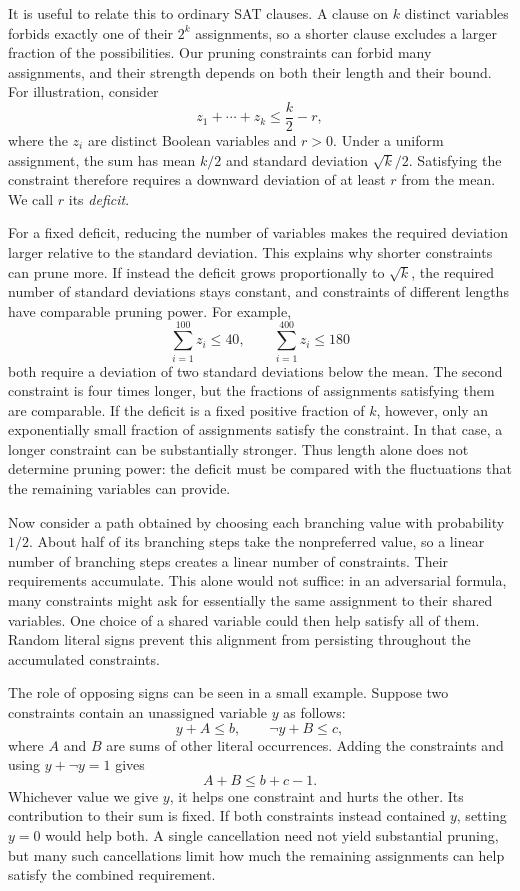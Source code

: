 \documentclass[11pt,a4paper]{article}
\theoremstyle{definition}
\theoremstyle{remark}
\begin{document}
It is useful to relate this to ordinary SAT clauses. A clause on $k$
distinct variables forbids exactly one of their $2^k$ assignments, so a
shorter clause excludes a larger fraction of the possibilities. Our
pruning constraints can forbid many assignments, and their strength
depends on both their length and their bound. For illustration, consider
\[
 z_1+\cdots+z_k\le \frac{k}{2}-r,
\]
where the $z_i$ are distinct Boolean variables and $r>0$. Under a uniform
assignment, the sum has mean $k/2$ and standard deviation $\sqrt{k}/2$.
Satisfying the constraint therefore requires a downward deviation of at
least $r$ from the mean. We call $r$ its \emph{deficit}.

For a fixed deficit, reducing the number of variables makes the required
deviation larger relative to the standard deviation. This explains why
shorter constraints can prune more. If instead the deficit grows
proportionally to $\sqrt{k}$, the required number of standard deviations
stays constant, and constraints of different lengths have comparable
pruning power. For example,
\[
 \sum_{i=1}^{100}z_i\le40,
 \qquad
 \sum_{i=1}^{400}z_i\le180
\]
both require a deviation of two standard deviations below the mean. The
second constraint is four times longer, but the fractions of assignments
satisfying them are comparable. If the deficit is a fixed positive
fraction of $k$, however, only an exponentially small fraction of
assignments satisfy the constraint. In that case, a longer constraint
can be substantially stronger. Thus length alone does not determine
pruning power: the deficit must be compared with the fluctuations that
the remaining variables can provide.

Now consider a path obtained by choosing each branching value with
probability $1/2$. About half of its branching steps take the nonpreferred
value, so a linear number of branching steps creates a linear number of
constraints. Their requirements accumulate. This alone would not suffice:
in an adversarial formula, many constraints might ask for essentially the
same assignment to their shared variables. One choice of a shared variable
could then help satisfy all of them. Random literal signs prevent this
alignment from persisting throughout the accumulated constraints.

The role of opposing signs can be seen in a small example. Suppose two
constraints contain an unassigned variable $y$ as follows:
\[
 y+A\le b,\qquad \neg y+B\le c,
\]
where $A$ and $B$ are sums of other literal occurrences. Adding the
constraints and using $y+\neg y=1$ gives
\[
 A+B\le b+c-1.
\]
Whichever value we give $y$, it helps one constraint and hurts the other.
Its contribution to their sum is fixed. If both constraints instead
contained $y$, setting $y=0$ would help both. A single cancellation need
not yield substantial pruning, but many such cancellations limit how much
the remaining assignments can help satisfy the combined requirement.
\end{document}
